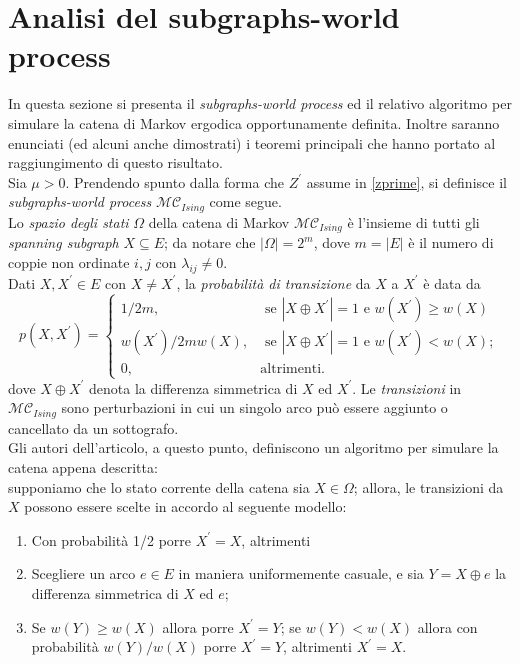 \section{Analisi del subgraphs-world process} \label{sec:swp}
In questa sezione si presenta il \textit{subgraphs-world process} ed il relativo algoritmo per simulare la catena di Markov ergodica opportunamente definita. Inoltre saranno enunciati (ed alcuni anche dimostrati) i teoremi principali che hanno portato al raggiungimento di questo risultato.\\
Sia $\mu > 0$. Prendendo spunto dalla forma che $Z^{\prime}$ assume in \ref{zprime}, si definisce il \textit{subgraphs-world process} $\mathcal{MC}_{Ising}$ come segue.\\
Lo \textit{spazio degli stati} $\Omega$ della catena di Markov $\mathcal{MC}_{Ising}$ è l'insieme di tutti gli \textit{spanning subgraph} $X \subseteq E$; da notare che $|\Omega| = 2^m$, dove $m = |E|$ è il numero di coppie non ordinate ${i,j}$ con $\lambda_{ij} \neq 0$.\\
Dati $X, X^{\prime} \in E$ con $X \neq X^{\prime}$, la \textit{probabilità di transizione} da $X$ a $X^\prime$ è data da
\begin{equation}
	p(X, X^\prime) =
	\begin{cases}
		1/2m, & \text{ se } |X \oplus X^\prime| = 1 \text{ e } w(X^\prime) \geq w(X)\\
		w(X^\prime)/2mw(X), & \text{ se } |X \oplus X^\prime| = 1 \text{ e } w(X^\prime) < w(X);\\
		0, & \text{altrimenti.}
	\end{cases}
	\label{pxxp}
\end{equation}
dove $X \oplus X^\prime$ denota la differenza simmetrica di $X$ ed $X^\prime$.
Le \textit{transizioni} in $\mathcal{MC}_{Ising}$ sono perturbazioni in cui un singolo arco può essere aggiunto o cancellato da un sottografo.\\
Gli autori dell'articolo, a questo punto, definiscono un algoritmo per simulare la catena appena descritta:\\
supponiamo che lo stato corrente della catena sia $X \in \Omega$; allora, le transizioni da $X$ possono essere scelte in accordo al seguente modello:
\begin{enumerate}
	\item Con probabilità 1/2 porre $X^\prime = X$, altrimenti
	\item Scegliere un arco $e \in E$ in maniera uniformemente casuale, e sia $Y = X \oplus {e}$ la differenza simmetrica di $X$ ed ${e}$;
	\item Se $w(Y) \geq w(X)$ allora porre $X^\prime = Y$; se $w(Y) < w(X)$ allora con probabilità $w(Y)/w(X)$ porre $X^\prime = Y$, altrimenti $X^\prime = X$.
\end{enumerate}
